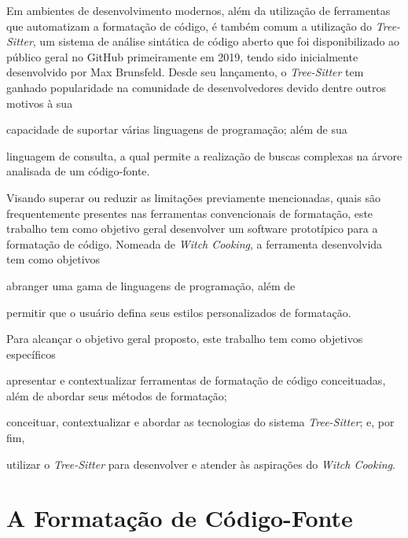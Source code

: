 \documentclass
  [11pt,a4paper,english,brazil,openright,sumario=tradicional,twoside]
  {abntex2}
\newcommand{\treesitter}{\textit{Tree-Sitter}\xspace}
\newcommand{\witchcooking}{\textit{Witch Cooking}\xspace}
\begin{document}
  Em ambientes de desenvolvimento modernos, além da utilização de ferramentas
  que automatizam a formatação de código, é também comum a utilização do
  \treesitter \cite{tree-sitter-2018-tree}, um sistema de análise sintática de
  código aberto que foi disponibilizado ao público geral no GitHub
  primeiramente em 2019, tendo sido inicialmente desenvolvido por Max
  Brunsfeld. Desde seu lançamento, o \treesitter tem ganhado popularidade na
  comunidade de desenvolvedores devido dentre outros motivos à sua
  \begin{inparaenum}
    \item capacidade de suportar várias linguagens de programação; além de sua
    \item linguagem de consulta, a qual permite a realização de buscas
          complexas na árvore analisada de um código-fonte.
  \end{inparaenum}

  Visando superar ou reduzir as limitações previamente mencionadas, quais são
  frequentemente presentes nas ferramentas convencionais de formatação, este
  trabalho tem como objetivo geral desenvolver um software prototípico para a
  formatação de código. Nomeada de \witchcooking \cite{silva-2023-witch}, a
  ferramenta desenvolvida tem como objetivos
  \begin{inparaenum}
    \item abranger uma gama de linguagens de programação, além de
    \item permitir que o usuário defina seus estilos personalizados de
          formatação.
  \end{inparaenum}

  Para alcançar o objetivo geral proposto, este trabalho tem como objetivos
  específicos
  \begin{inparaenum}
    \item apresentar e contextualizar ferramentas de formatação de código
          conceituadas, além de abordar seus métodos de formatação;
    \item conceituar, contextualizar e abordar as tecnologias do sistema
          \treesitter; e, por fim,
    \item utilizar o \treesitter para desenvolver e atender às aspirações do
          \witchcooking.
  \end{inparaenum}


  \chapter{A Formatação de Código-Fonte}
\end{document}
